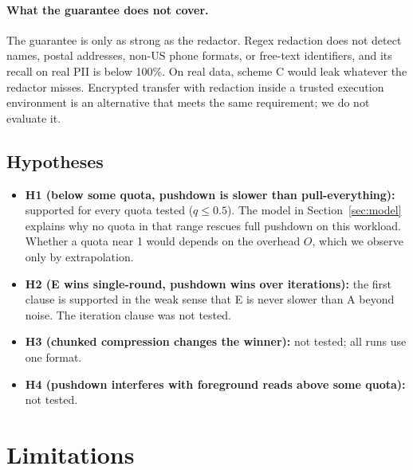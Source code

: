 \documentclass[11pt]{article}
\begin{document}
\paragraph{What the guarantee does not cover.} The guarantee is only as strong as the redactor. Regex redaction does not detect names, postal addresses, non-US phone formats, or free-text identifiers, and its recall on real PII is below 100\%. On real data, scheme C would leak whatever the redactor misses. Encrypted transfer with redaction inside a trusted execution environment is an alternative that meets the same requirement; we do not evaluate it.

\subsection{Hypotheses}
\label{sec:hypotheses}

\begin{itemize}
\item \textbf{H1 (below some quota, pushdown is slower than pull-everything):} supported for every quota tested ($q \le 0.5$). The model in Section~\ref{sec:model} explains why no quota in that range rescues full pushdown on this workload. Whether a quota near 1 would depends on the overhead $O$, which we observe only by extrapolation.
\item \textbf{H2 (E wins single-round, pushdown wins over iterations):} the first clause is supported in the weak sense that E is never slower than A beyond noise. The iteration clause was not tested.
\item \textbf{H3 (chunked compression changes the winner):} not tested; all runs use one format.
\item \textbf{H4 (pushdown interferes with foreground reads above some quota):} not tested.
\end{itemize}

\section{Limitations}
\label{sec:limitations}
\end{document}
